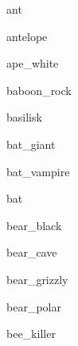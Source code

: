 \documentclass[letterpaper,serif]{module}
\begin{document}
\raggedbottom

\begin{newmonster}{ant}\end{newmonster}

\begin{newmonster}{antelope}\end{newmonster}

\begin{newmonster}{ape_white}\end{newmonster}

\begin{newmonster}{baboon_rock}\end{newmonster}

\begin{newmonster}{basilisk}\end{newmonster}

\begin{newmonster}{bat_giant}\end{newmonster}

\begin{newmonster}{bat_vampire}\end{newmonster}

\begin{newmonster}{bat}\end{newmonster}

\begin{newmonster}{bear_black}\end{newmonster}

\begin{newmonster}{bear_cave}\end{newmonster}

\begin{newmonster}{bear_grizzly}\end{newmonster}

\begin{newmonster}{bear_polar}\end{newmonster}

\begin{newmonster}{bee_killer}\end{newmonster}
\end{document}
